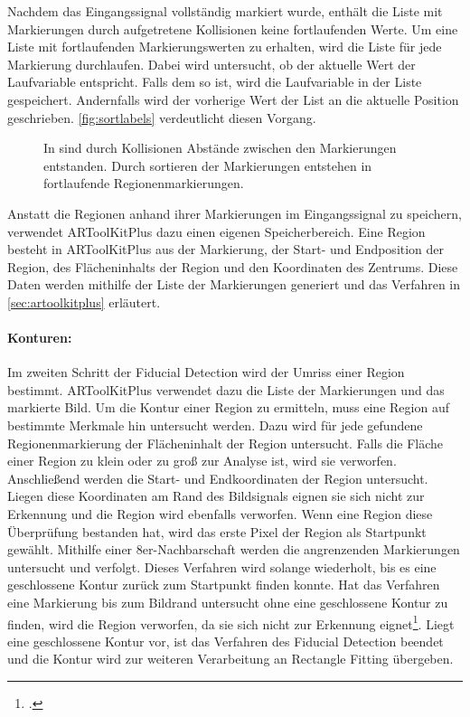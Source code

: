 Nachdem das Eingangssignal vollständig markiert wurde, enthält die Liste mit Markierungen durch aufgetretene Kollisionen
 keine fortlaufenden Werte. Um eine Liste mit fortlaufenden Markierungswerten zu erhalten, wird die Liste für jede
 Markierung durchlaufen. Dabei wird untersucht, ob der aktuelle Wert der Laufvariable entspricht. Falls dem so ist,
 wird die Laufvariable in der Liste gespeichert. Andernfalls wird der vorherige Wert der List an die aktuelle Position
 geschrieben. \autoref{fig:sortlabels} verdeutlicht diesen Vorgang.
\begin{figure}[!ht]
	\centering
	\caption{In  sind durch Kollisionen Abstände zwischen den Markierungen entstanden. Durch
	 sortieren der Markierungen entstehen in  fortlaufende Regionenmarkierungen.}
	\label{fig:sortlabels}
\end{figure}

Anstatt die Regionen anhand ihrer Markierungen im Eingangssignal zu speichern, verwendet ARToolKitPlus dazu einen
 eigenen Speicherbereich. Eine Region besteht in ARToolKitPlus aus der Markierung, der Start- und Endposition der
 Region, des Flächeninhalts der Region und den Koordinaten des Zentrums. Diese Daten werden mithilfe der Liste der
 Markierungen generiert und das Verfahren in \autoref{sec:artoolkitplus} erläutert.

\paragraph{Konturen:} %
\label{par:konturen}
Im zweiten Schritt der Fiducial Detection wird der Umriss einer Region bestimmt. ARToolKitPlus verwendet dazu die Liste
 der Markierungen und das markierte Bild. Um die Kontur einer Region zu ermitteln, muss eine Region auf bestimmte
 Merkmale hin untersucht werden. Dazu wird für jede gefundene Regionenmarkierung der Flächeninhalt der Region
 untersucht. Falls die Fläche einer Region zu klein oder zu groß zur Analyse ist, wird sie verworfen. Anschließend
 werden die Start- und Endkoordinaten der Region untersucht. Liegen diese Koordinaten am Rand des Bildsignals eignen
 sie sich nicht zur Erkennung und die Region wird ebenfalls verworfen. Wenn eine Region diese Überprüfung bestanden
 hat, wird das erste Pixel der Region als Startpunkt gewählt. Mithilfe einer 8er-Nachbarschaft werden die angrenzenden
 Markierungen untersucht und verfolgt. Dieses Verfahren wird solange wiederholt, bis es eine geschlossene Kontur zurück
 zum Startpunkt finden konnte. Hat das Verfahren eine Markierung bis zum Bildrand untersucht ohne eine geschlossene
 Kontur zu finden, wird die Region verworfen, da sie sich nicht zur Erkennung
 eignet\footcite[Vgl.][S.~41--42]{wagner07a}. Liegt eine geschlossene Kontur vor, ist das Verfahren des Fiducial
 Detection beendet und die Kontur wird zur weiteren Verarbeitung an Rectangle Fitting übergeben.

